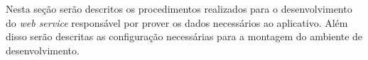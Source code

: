 
	\par Nesta seção serão descritos os procedimentos realizados para o
desenvolvimento do \textit{web service} responsável por prover os dados
necessários ao aplicativo. Além disso serão descritas as configuração
necessárias para a montagem do ambiente de desenvolvimento.